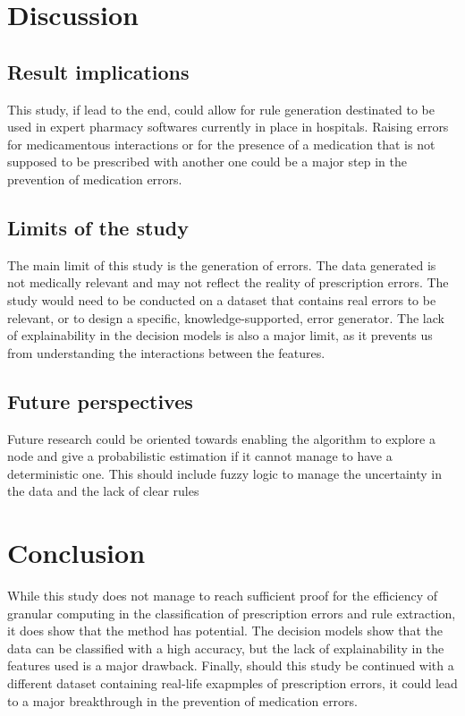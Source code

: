 \documentclass[a4paper,12pt]{article}
\begin{document}
\section{Discussion}
\subsection{Result implications}
This study, if lead to the end, could allow for rule generation destinated to be used in expert pharmacy softwares currently in place in hospitals. Raising errors for medicamentous interactions or for the presence of a medication that is not supposed to be prescribed with another one could be a major step in the prevention of medication errors.

\subsection{Limits of the study}
The main limit of this study is the generation of errors. The data generated is not medically relevant and may not reflect the reality of prescription errors. The study would need to be conducted on a dataset that contains real errors to be relevant, or to design a specific, knowledge-supported, error generator. The lack of explainability in the decision models is also a major limit, as it prevents us from understanding the interactions between the features.
\subsection{Future perspectives}
Future research could be oriented towards enabling the algorithm to explore a node and give a probabilistic estimation if it cannot manage to have a deterministic one.
This should include fuzzy logic to manage the uncertainty in the data and the lack of clear rules


\section{Conclusion}
While this study does not manage to reach sufficient proof for the efficiency of granular computing in the classification of prescription errors and rule extraction, it does show that the method has potential. The decision models show that the data can be classified with a high accuracy, but the lack of explainability in the features used is a major drawback. Finally, should this study be continued with a different dataset containing real-life exapmples of prescription errors, it could lead to a major breakthrough in the prevention of medication errors.
\printbibliography
\end{document}
